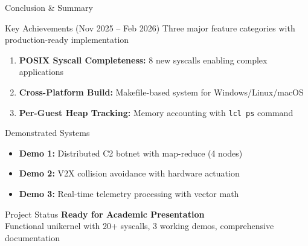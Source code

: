 \documentclass[aspectratio=169, 10pt]{beamer}
\begin{document}
\begin{frame}{Conclusion \& Summary}
    \begin{block}{Key Achievements (Nov 2025 -- Feb 2026)}
        \centering
        Three major feature categories with production-ready implementation
    \end{block}

    \vspace{0.3cm}
    \begin{enumerate}
        \item \textbf{POSIX Syscall Completeness:} 8 new syscalls enabling complex applications
        \item \textbf{Cross-Platform Build:} Makefile-based system for Windows/Linux/macOS
        \item \textbf{Per-Guest Heap Tracking:} Memory accounting with \texttt{lcl ps} command
    \end{enumerate}

    \vspace{0.3cm}
    \begin{exampleblock}{Demonstrated Systems}
        \begin{itemize}\setlength{\itemsep}{2pt}
            \item \textbf{Demo 1:} Distributed C2 botnet with map-reduce (4 nodes)
            \item \textbf{Demo 2:} V2X collision avoidance with hardware actuation
            \item \textbf{Demo 3:} Real-time telemetry processing with vector math
        \end{itemize}
    \end{exampleblock}

    \vspace{0.3cm}
    \begin{alertblock}{Project Status}
        \centering
        \textbf{Ready for Academic Presentation} \\
        \vspace{0.1cm}
        \small Functional unikernel with 20+ syscalls, 3 working demos, comprehensive documentation
    \end{alertblock}
\end{frame}
\end{document}
